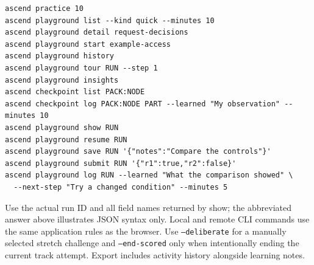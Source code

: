 \begin{verbatim}
ascend practice 10
ascend playground list --kind quick --minutes 10
ascend playground detail request-decisions
ascend playground start example-access
ascend playground history
ascend playground tour RUN --step 1
ascend playground insights
ascend checkpoint list PACK:NODE
ascend checkpoint log PACK:NODE PART --learned "My observation" --minutes 10
ascend playground show RUN
ascend playground resume RUN
ascend playground save RUN '{"notes":"Compare the controls"}'
ascend playground submit RUN '{"r1":true,"r2":false}'
ascend playground log RUN --learned "What the comparison showed" \
  --next-step "Try a changed condition" --minutes 5
\end{verbatim}
Use the actual run ID and all field names returned by show; the abbreviated answer
above illustrates JSON syntax only. Local and remote CLI commands use the same
application rules as the browser. Use \texttt{--deliberate} for a manually selected
stretch challenge and \texttt{--end-scored} only when intentionally ending the
current track attempt. Export includes activity history alongside learning notes.

